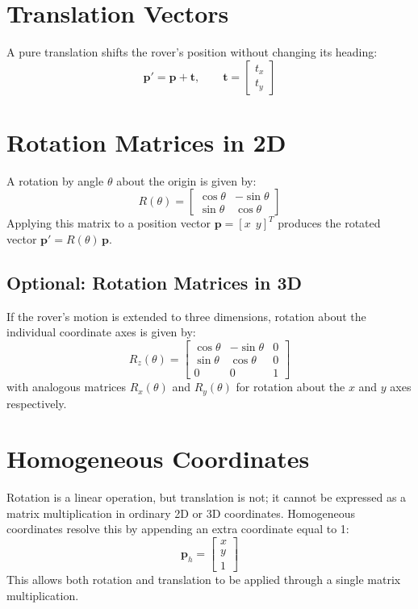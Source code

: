 \documentclass[12pt]{report}
\begin{document}
\section{Translation Vectors}
A pure translation shifts the rover's position without changing its heading:
\begin{equation}
\mathbf{p}' = \mathbf{p} + \mathbf{t}, \qquad
\mathbf{t} = \begin{bmatrix} t_x \\ t_y \end{bmatrix}
\end{equation}

\section{Rotation Matrices in 2D}
A rotation by angle $\theta$ about the origin is given by:
\begin{equation}
R(\theta) =
\begin{bmatrix}
\cos\theta & -\sin\theta \\
\sin\theta & \cos\theta
\end{bmatrix}
\end{equation}
Applying this matrix to a position vector $\mathbf{p} = [x\ \ y]^T$ produces the rotated vector $\mathbf{p}' = R(\theta)\,\mathbf{p}$.

\subsection{Optional: Rotation Matrices in 3D}
If the rover's motion is extended to three dimensions, rotation about the individual coordinate axes is given by:
\begin{equation}
R_z(\theta) =
\begin{bmatrix}
\cos\theta & -\sin\theta & 0 \\
\sin\theta & \cos\theta & 0 \\
0 & 0 & 1
\end{bmatrix}
\end{equation}
with analogous matrices $R_x(\theta)$ and $R_y(\theta)$ for rotation about the $x$ and $y$ axes respectively.

\section{Homogeneous Coordinates}
Rotation is a linear operation, but translation is not; it cannot be expressed as a matrix multiplication in ordinary 2D or 3D coordinates. Homogeneous coordinates resolve this by appending an extra coordinate equal to 1:
\begin{equation}
\mathbf{p}_h = \begin{bmatrix} x \\ y \\ 1 \end{bmatrix}
\end{equation}
This allows both rotation and translation to be applied through a single matrix multiplication.
\end{document}
